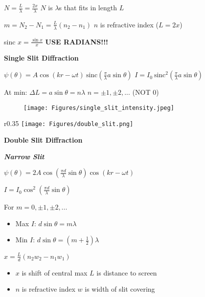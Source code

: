 \documentclass[twocolumn]{article}
\begin{document}
$N = \frac{L}{\lambda} = \frac{2 x}{\lambda}$ \hfill $N$ is $\lambda$s that fits in length $L$

$m = N_2 - N_1 = \frac{L}{\lambda} (n_2 - n_1)$ \hfill $n$ is refractive index ($L = 2x$)

sinc $x = \frac{\sin x}{x}$ \hfill \textbf{USE RADIANS!!!}


\newpage

\textbf{Single Slit Diffraction}

$\psi(\theta) = A \cos (kr - \omega t)\ \text{sinc} \left( \frac{\pi}{\lambda} a \sin\theta \right)$ \hfill $I = I_0\ \text{sinc}^2 \left( \frac{\pi}{\lambda} a \sin\theta \right)$

At min: $\Delta L = a \sin \theta = n \lambda$ \hfill $n = \pm 1, \pm 2, ...$ (NOT 0)

\vspace{-1em}
\begin{figure}[h]
    \centering
    \texttt{[image: Figures/single\_slit\_intensity.jpeg]}
\end{figure}

\vspace{-1.5em}

\dotfill


\begin{wrapfigure}[7]{r}{0.35\columnwidth}
    \texttt{[image: Figures/double\_slit.png]}
\end{wrapfigure}

\textbf{Double Slit Diffraction}

\textbf{\textit{Narrow Slit}}

$\psi(\theta) = 2A \cos(\frac{\pi d}{\lambda} \sin \theta) \cos(kr - \omega t)$

$I = I_0 \cos^2 \left( \frac{\pi d}{\lambda} \sin \theta \right)$

For $m=0, \pm 1, \pm 2, ...$ \vspace{-.5em}
\begin{itemize}
    \item Max $I$: $d \sin \theta = m\lambda$
    \item Min $I$: $d \sin \theta = \left( m + \frac{1}{2} \right) \lambda$
\end{itemize}

$x = \frac{L}{d} (n_2 w_2 - n_1 w_1)$ \vspace{-.5em}
\begin{itemize}
    \item $x$ is shift of central max \hfill $L$ is distance to screen
    \item $n$ is refractive index \hfill $w$ is width of slit covering
\end{itemize}
\end{document}
